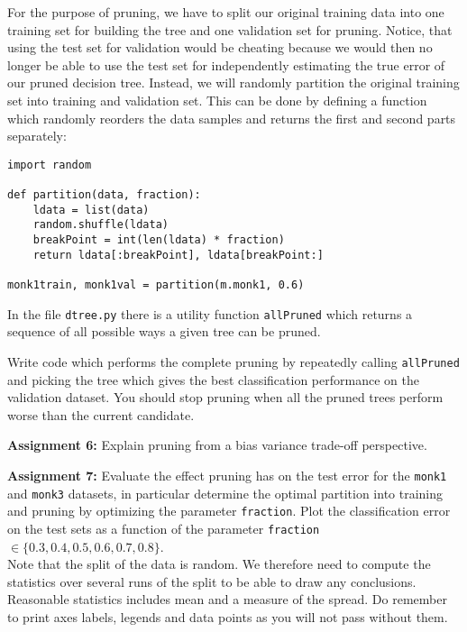 \documentclass[11pt]{article}
\begin{document}
For the purpose of pruning, we have to split our original training
data into one training set for building the tree and one validation
set for pruning.  Notice, that using the test set for validation would
be cheating because we would then no longer be able to use the test
set for independently estimating the true error of our pruned decision
tree.  Instead, we will randomly partition the original training set into
training and validation set.  This can be done by defining a function
which randomly reorders the data samples and returns the first and second
parts separately:
\begin{verbatim}
import random

def partition(data, fraction):
    ldata = list(data)
    random.shuffle(ldata)
    breakPoint = int(len(ldata) * fraction)
    return ldata[:breakPoint], ldata[breakPoint:]

monk1train, monk1val = partition(m.monk1, 0.6)
\end{verbatim}

In the file \verb!dtree.py! there is a utility function \texttt{allPruned}
which returns a sequence of all possible ways a given tree can be pruned.

Write code which performs the complete pruning by repeatedly calling
\texttt{allPruned} and picking the tree which gives the best
classification performance on the validation dataset.  You should stop
pruning when all the pruned trees perform worse than the current
candidate.

\begin{tcolorbox}
\textbf{Assignment 6:}
Explain pruning from a bias variance trade-off perspective.
\end{tcolorbox}

\begin{tcolorbox}
\textbf{Assignment 7:} Evaluate the effect pruning has on the test
error for the \texttt{monk1} and \texttt{monk3} datasets, in
particular determine the optimal partition into training and pruning
by optimizing the parameter \texttt{fraction}.  Plot the
classification error on the test sets as a function of the parameter
\texttt{fraction} $\in \{0.3,0.4,0.5,0.6,0.7,0.8\}$. \\

Note that the split of the data is random. We therefore need to compute 
the statistics over several runs of the split to be able to draw any 
conclusions. Reasonable statistics includes mean and a measure of the spread.
Do remember to print axes labels, legends and data points as you will not pass without them.
\end{tcolorbox}
\end{document}
